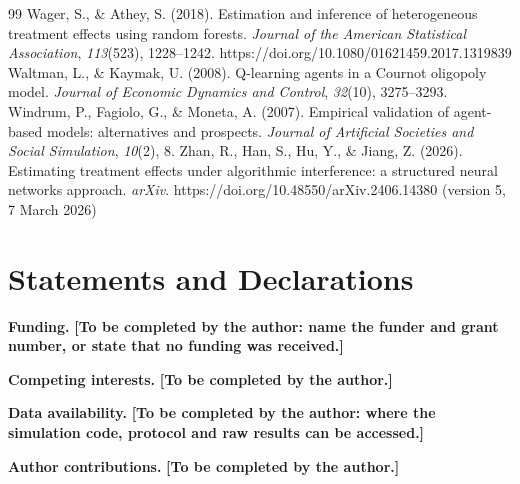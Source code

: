 \documentclass[11pt]{article}
\begin{document}
\begin{thebibliography}{99}
 Wager, S., \& Athey, S. (2018). Estimation and inference of heterogeneous treatment effects using random forests. \textit{Journal of the American Statistical Association}, \textit{113}(523), 1228--1242. https://doi.org/10.1080/01621459.2017.1319839
 Waltman, L., \& Kaymak, U. (2008). Q-learning agents in a Cournot oligopoly model. \textit{Journal of Economic Dynamics and Control}, \textit{32}(10), 3275--3293.
 Windrum, P., Fagiolo, G., \& Moneta, A. (2007). Empirical validation of agent-based models: alternatives and prospects. \textit{Journal of Artificial Societies and Social Simulation}, \textit{10}(2), 8.
 Zhan, R., Han, S., Hu, Y., \& Jiang, Z. (2026). Estimating treatment effects under algorithmic interference: a structured neural networks approach. \textit{arXiv}. https://doi.org/10.48550/arXiv.2406.14380 (version 5, 7 March 2026)
\end{thebibliography}

\section*{Statements and Declarations}
\textbf{Funding.} \textbf{[To be completed by the author: name the funder and grant number, or state that no funding was received.]}

\textbf{Competing interests.} \textbf{[To be completed by the author.]}

\textbf{Data availability.} \textbf{[To be completed by the author: where the simulation code, protocol and raw results can be accessed.]}

\textbf{Author contributions.} \textbf{[To be completed by the author.]}
\end{document}

